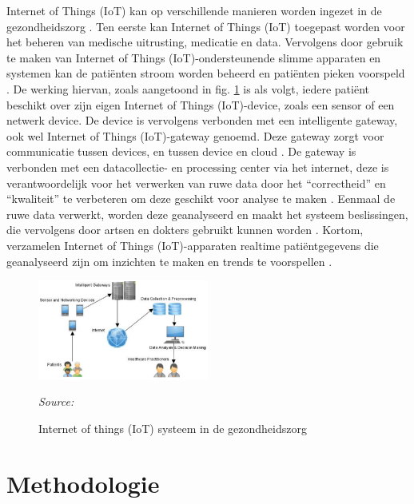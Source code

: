 Internet of Things (IoT) kan op verschillende manieren worden ingezet in de gezondheidszorg \autocite{Huang2021}. Ten eerste kan Internet of Things (IoT) toegepast worden voor het beheren van medische uitrusting, medicatie en data. Vervolgens door gebruik te maken van Internet of Things (IoT)-ondersteunende slimme apparaten en systemen kan de patiënten stroom worden beheerd \autocite{Almotaira2023} en patiënten pieken voorspeld \autocite{King2022}. De werking hiervan, zoals aangetoond in fig. \ref{fig:Figuur4} is als volgt, iedere patiënt beschikt over zijn eigen Internet of Things (IoT)-device, zoals een sensor of een netwerk device. De device is vervolgens verbonden met een intelligente gateway, ook wel Internet of Things (IoT)-gateway genoemd. Deze gateway zorgt voor communicatie tussen devices, en tussen device en cloud \autocite{Upadrista2021}. De gateway is verbonden met een datacollectie- en processing center via het internet, deze is verantwoordelijk voor het verwerken van ruwe data door het “correctheid” en “kwaliteit” te verbeteren om deze geschikt voor analyse te maken \autocite{Sirisha2023}. Eenmaal de ruwe data verwerkt, worden deze geanalyseerd en maakt het systeem beslissingen, die vervolgens door artsen en dokters gebruikt kunnen worden \autocite{Singh2023}. Kortom, verzamelen Internet of Things (IoT)-apparaten realtime patiëntgegevens die geanalyseerd zijn om inzichten te maken en trends te voorspellen \autocite{Alrehaili2023, Sidhu2023}. 

\begin{figure}[h]
    \centering
    \includegraphics[width=0.5\textwidth]{img/Figuur-4}
    \caption{Internet of things (IoT) systeem in de gezondheidszorg}
    \label{fig:Figuur4}
    \textit{Source: \autocite{Singh2023}}
\end{figure}


\section{Methodologie}%
\label{sec:methodologie}

